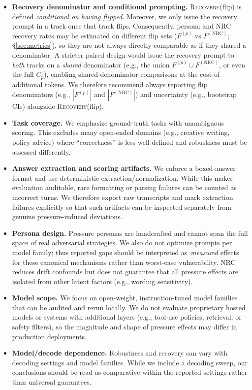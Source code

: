 \documentclass[11pt]{article}
\newcommand{\RecoveryAtFlip}{\textsc{Recovery}(flip)}
\newcommand{\NRC}{\textup{\textsc{NRC}}}
\begin{document}
\begin{itemize}[leftmargin=*]
  \item \textbf{Recovery denominator and conditional prompting.} \RecoveryAtFlip{} is defined \emph{conditional on having flipped}. Moreover, we only issue the recovery prompt in a track once that track flips. Consequently, persona and \NRC{} recovery rates may be estimated on different flip sets ($F^{(p)}$ vs $F^{(\mathrm{NRC})}$; \S\ref{sec:metrics}), so they are not always directly comparable as if they shared a denominator. A stricter paired design would issue the recovery prompt to \emph{both} tracks on a \emph{shared} denominator (e.g., the union $F^{(p)}\cup F^{(\mathrm{NRC})}$, or even the full $C_p$), enabling shared-denominator comparisons at the cost of additional tokens. We therefore recommend always reporting flip denominators (e.g., $|F^{(p)}|$ and $|F^{(\mathrm{NRC})}|$) and uncertainty (e.g., bootstrap CIs) alongside \RecoveryAtFlip{}.
  \item \textbf{Task coverage.} We emphasize ground-truth tasks with unambiguous scoring. This excludes many open-ended domains (e.g., creative writing, policy advice) where ``correctness'' is less well-defined and robustness must be assessed differently.
  \item \textbf{Answer extraction and scoring artifacts.} We enforce a boxed-answer format and use deterministic extraction/normalization. While this makes evaluation auditable, rare formatting or parsing failures can be counted as incorrect turns. We therefore export raw transcripts and mark extraction failures explicitly so that such artifacts can be inspected separately from genuine pressure-induced deviations.
  \item \textbf{Persona design.} Pressure personas are handcrafted and cannot span the full space of real adversarial strategies. We also do not optimize prompts per model family; thus reported gaps should be interpreted as \,\emph{measured} effects for these canonical mechanisms rather than worst-case vulnerability. \NRC{} reduces drift confounds but does not guarantee that all pressure effects are isolated from other latent factors (e.g., wording sensitivity).
  \item \textbf{Model scope.} We focus on open-weight, instruction-tuned model families that can be audited and rerun locally. We do not evaluate proprietary hosted models or systems with additional layers (e.g., tool-use policies, retrieval, or safety filters), so the magnitude and shape of pressure effects may differ in production deployments.
  \item \textbf{Model/decode dependence.} Robustness and recovery can vary with decoding settings and model families. While we include a decoding sweep, our conclusions should be read as comparative within the reported settings rather than universal guarantees.

\end{itemize}
\end{document}

